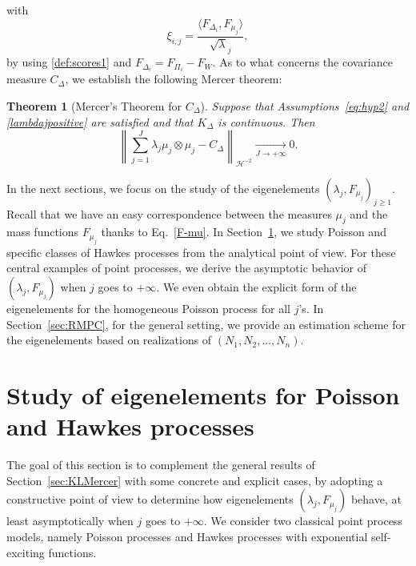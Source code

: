 \documentclass[aos]{imsart}
\theoremstyle{plain}
\newtheorem{theorem}{Theorem}[section]
\theoremstyle{remark}
\newcommand{\1}{1}
\begin{document}
with
\begin{equation}\label{def:scores}
\xi_{i,j} = \frac{\langle F_{\Delta_i},F_{\mu_j}\rangle}{\sqrt\lambda_j},
\end{equation}
by using \eqref{def:scores1} and $F_{\Delta_i}=F_{\Pi_i}-F_W$. 
As to what concerns the covariance measure $C_\Delta$, we establish the following Mercer theorem: 
\begin{theorem}[Mercer's Theorem for $C_\Delta$]
\label{thm:Mercer}
Suppose that Assumptions~\eqref{eq:hyp2} and \eqref{lambdajpositive} are satisfied and that $K_\Delta$ is continuous. Then
\begin{equation}\label{eq:CVunif}
\left\|\sum_{j=1}^J\lambda_j\mu_j\otimes\mu_j-C_{\Delta}\right\|_{\mathcal H^{-2}}\xrightarrow[J\to+\infty]{}0.
\end{equation}
\end{theorem}
In the next sections, we focus on the study of the eigenelements $(\lambda_j,F_{\mu_j})_{j\geq 1}$. Recall that we have an easy correspondence between the measures $\mu_j$ and the mass functions $F_{\mu_j}$ thanks to Eq.~\eqref{F-mu}. In Section~\ref{sec:illust}, we study Poisson and specific classes of Hawkes processes from the analytical point of view. For these central examples of point processes,  we derive the asymptotic behavior of $(\lambda_j,F_{\mu_j})$ when $j$ goes to $+\infty$. We even obtain the explicit form of the eigenelements for the homogeneous Poisson process for all $j$'s. In Section~\ref{sec:RMPC}, for the general setting, we provide an estimation scheme for the eigenelements based on realizations of $(N_1, N_2, ..., N_n)$. 
\section{Study of eigenelements for Poisson and Hawkes processes}\label{sec:illust}
The goal of this section is to complement the general results of Section~\ref{sec:KLMercer} with some concrete and explicit cases, by adopting a constructive point of view to determine how eigenelements  $(\lambda_j,F_{\mu_j})$ behave, at least asymptotically when $j$ goes to $+\infty$. We consider two classical point process models, namely Poisson processes and Hawkes  processes with exponential self-exciting functions.
\end{document}
